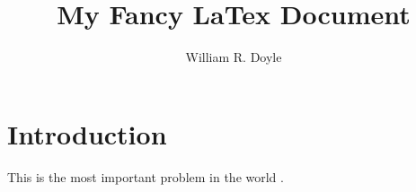 \documentclass[12pt]{article}
\title{My Fancy LaTex Document}
\author{William R. Doyle}
\begin{document}
\maketitle


\section{Introduction}

This is the most important problem in the world \citep{rigby2014three}.

\section{}







\end{document}
